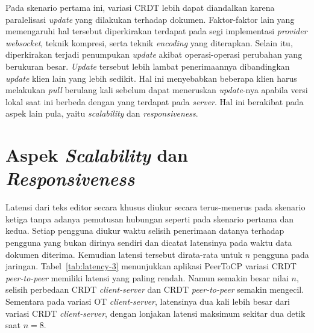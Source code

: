 Pada skenario pertama ini, variasi CRDT lebih dapat diandalkan karena paralelisasi \textit{update} yang dilakukan terhadap dokumen. Faktor-faktor lain yang memengaruhi hal tersebut diperkirakan terdapat pada segi implementasi \textit{provider websocket}, teknik kompresi, serta teknik \textit{encoding} yang diterapkan. Selain itu, diperkirakan terjadi  penumpukan \textit{update} akibat operasi-operasi perubahan yang berukuran besar. \textit{Update} tersebut lebih lambat penerimaannya dibandingkan \textit{update} klien lain yang lebih sedikit. Hal ini menyebabkan beberapa klien harus melakukan \textit{pull} berulang kali sebelum dapat meneruskan \textit{update}-nya apabila versi lokal saat ini berbeda dengan yang terdapat pada \textit{server}. Hal ini berakibat pada aspek lain pula, yaitu \textit{scalability} dan \textit{responsiveness}.

\section{Aspek \textit{Scalability} dan \textit{Responsiveness}}

Latensi dari teks editor secara khusus diukur secara terus-menerus pada skenario ketiga tanpa adanya pemutusan hubungan seperti pada skenario pertama dan kedua. Setiap pengguna diukur waktu selisih penerimaan datanya terhadap pengguna yang bukan dirinya sendiri dan dicatat latensinya pada waktu data dokumen diterima. Kemudian latensi tersebut dirata-rata untuk $n$ pengguna pada jaringan. Tabel~\ref{tab:latency-3} menunjukkan aplikasi PeerToCP variasi CRDT \textit{peer-to-peer} memiliki latensi yang paling rendah. Namun semakin besar nilai $n$, selisih perbedaan CRDT \textit{client-server} dan CRDT \textit{peer-to-peer} semakin mengecil. Sementara pada variasi OT \textit{client-server}, latensinya dua kali lebih besar dari variasi CRDT \textit{client-server}, dengan lonjakan latensi maksimum sekitar dua detik saat $n = 8$.

